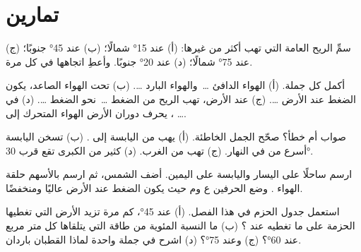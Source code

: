 \section{تمارين}

\begin{exercise}[$\star$]\label{exo:g8:winds-global-circulation:1}
سمِّ الريح العامة التي تهب أكثر من غيرها: (أ) عند \ang{15} شمالًا؛
(ب) عند \ang{45} جنوبًا؛ (ج) عند \ang{75} شمالًا؛ (د) عند \ang{20} جنوبًا.
وأعطِ اتجاهها في كل مرة.
\end{exercise}

\begin{exercise}[$\star$]\label{exo:g8:winds-global-circulation:2}
أكمل كل جملة. (أ) الهواء الدافئ \dots\ والهواء البارد \dots. (ب) تحت
الهواء الصاعد، يكون الضغط عند الأرض \dots. (ج) عند الأرض، تهب الريح من
الضغط \dots\ نحو الضغط \dots. (د) في ، يحرف دوران الأرض
الهواء المتحرك إلى \dots.
\end{exercise}

\begin{exercise}[$\star$]\label{exo:g8:winds-global-circulation:3}
صواب أم خطأ؟ صحّح الجمل الخاطئة. (أ) يهب  من اليابسة إلى
. (ب) تسخن اليابسة أسرع من  في النهار. (ج) تهب 
من الغرب. (د) كثير من  الكبرى تقع قرب 
\ang{30}.
\end{exercise}

\begin{exercise}[$\star$]\label{exo:g8:winds-global-circulation:4}
ارسم ساحلًا  على اليسار واليابسة على اليمين. أضف الشمس، ثم ارسم
بالأسهم حلقة الهواء . وضع الحرفين ع وم حيث يكون الضغط عند
الأرض عاليًا ومنخفضًا.
\end{exercise}

\begin{exercise}[$\star\star$]\label{exo:g8:winds-global-circulation:5}
استعمل جدول الحزم في هذا الفصل. (أ) عند \ang{45}، كم مرة تزيد الأرض التي
تغطيها الحزمة على ما تغطيه عند ؟ (ب) ما النسبة المئوية من طاقة
 التي يتلقاها كل متر مربع عند \ang{60}؟ (ج) وعند
\ang{75}؟ (د) اشرح في جملة واحدة لماذا القطبان باردان.
\end{exercise}

